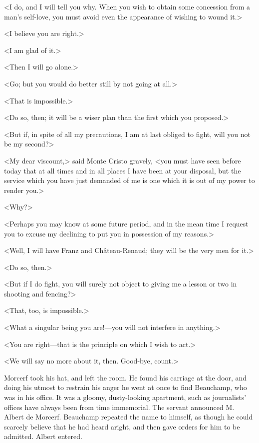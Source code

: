  <I do, and I will tell you why. When you wish to obtain some concession from a man's self-love, you must avoid even the appearance of wishing to wound it.> 

 <I believe you are right.> 

 <I am glad of it.> 

 <Then I will go alone.> 

 <Go; but you would do better still by not going at all.> 

 <That is impossible.> 

 <Do so, then; it will be a wiser plan than the first which you proposed.> 

 <But if, in spite of all my precautions, I am at last obliged to fight, will you not be my second?> 

 <My dear viscount,> said Monte Cristo gravely, <you must have seen before today that at all times and in all places I have been at your disposal, but the service which you have just demanded of me is one which it is out of my power to render you.> 

 <Why?> 

 <Perhaps you may know at some future period, and in the mean time I request you to excuse my declining to put you in possession of my reasons.> 

 <Well, I will have Franz and Château-Renaud; they will be the very men for it.> 

 <Do so, then.> 

 <But if I do fight, you will surely not object to giving me a lesson or two in shooting and fencing?> 

 <That, too, is impossible.> 

 <What a singular being you are!—you will not interfere in anything.> 

 <You are right—that is the principle on which I wish to act.> 

 <We will say no more about it, then. Good-bye, count.> 

 Morcerf took his hat, and left the room. He found his carriage at the door, and doing his utmost to restrain his anger he went at once to find Beauchamp, who was in his office. It was a gloomy, dusty-looking apartment, such as journalists' offices have always been from time immemorial. The servant announced M. Albert de Morcerf. Beauchamp repeated the name to himself, as though he could scarcely believe that he had heard aright, and then gave orders for him to be admitted. Albert entered. 

